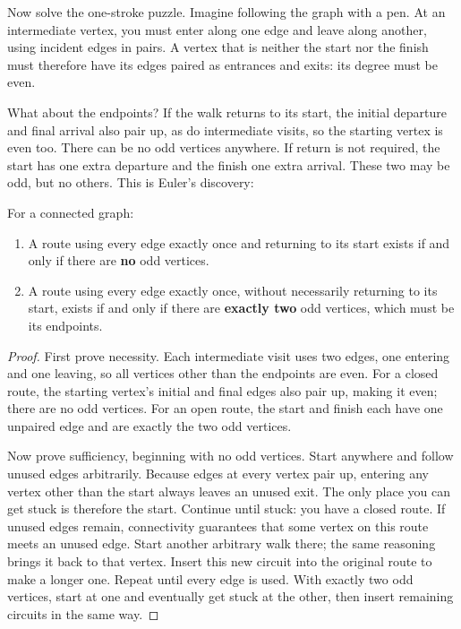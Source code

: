 Now solve the one-stroke puzzle. Imagine following the graph with a pen. At an intermediate vertex, you must enter along one edge and leave along another, using incident edges in pairs. A vertex that is neither the start nor the finish must therefore have its edges paired as entrances and exits: its degree must be even.

What about the endpoints? If the walk returns to its start, the initial departure and final arrival also pair up, as do intermediate visits, so the starting vertex is even too. There can be no odd vertices anywhere. If return is not required, the start has one extra departure and the finish one extra arrival. These two may be odd, but no others. This is Euler's discovery:

\begin{dingli}
For a connected graph:
\begin{enumerate}
  \item A route using every edge exactly once and returning to its start exists if and only if there are \textbf{no} odd vertices.
  \item A route using every edge exactly once, without necessarily returning to its start, exists if and only if there are \textbf{exactly two} odd vertices, which must be its endpoints.
\end{enumerate}
\end{dingli}

\begin{proof}
First prove necessity. Each intermediate visit uses two edges, one entering and one leaving, so all vertices other than the endpoints are even. For a closed route, the starting vertex's initial and final edges also pair up, making it even; there are no odd vertices. For an open route, the start and finish each have one unpaired edge and are exactly the two odd vertices.

Now prove sufficiency, beginning with no odd vertices. Start anywhere and follow unused edges arbitrarily. Because edges at every vertex pair up, entering any vertex other than the start always leaves an unused exit. The only place you can get stuck is therefore the start. Continue until stuck: you have a closed route. If unused edges remain, connectivity guarantees that some vertex on this route meets an unused edge. Start another arbitrary walk there; the same reasoning brings it back to that vertex. Insert this new circuit into the original route to make a longer one. Repeat until every edge is used. With exactly two odd vertices, start at one and eventually get stuck at the other, then insert remaining circuits in the same way.
\end{proof}

